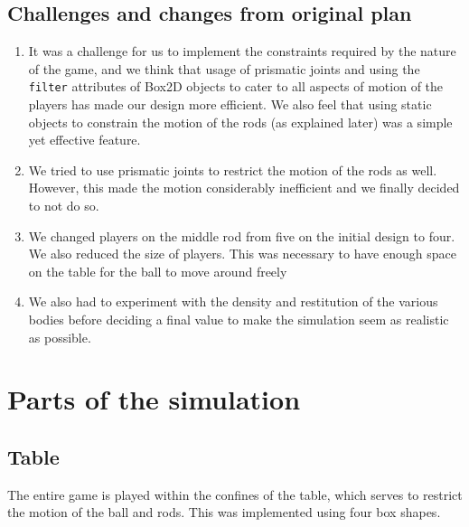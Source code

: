 \documentclass{article}
\begin{document}
\subsection{Challenges and changes from original plan}
\begin{enumerate}
\item It was a challenge for us to implement the constraints required by the nature of the game, and we think that usage of prismatic joints and using the \texttt{filter} attributes of Box2D objects to cater to all aspects of motion of the players has made our design more efficient. We also feel that using static objects to constrain the motion of the rods (as explained later) was a simple yet effective feature.\\
\item We tried to use prismatic joints to restrict the motion of the rods as well. However, this made the motion considerably inefficient and we finally decided to not do so.
\item We changed players on the middle rod from five on the initial design to four. We also reduced the size of players. This was necessary to have enough space on the table for the ball to move around freely
\item We also had to experiment with the density and restitution of the various bodies before deciding a final value to make the simulation seem as realistic as possible.
\end{enumerate}

\section{Parts of the simulation}

\subsection{Table}
The entire game is played within the confines of the table, which serves to restrict the motion of the ball and rods. This was implemented using four box shapes.\\
\end{document}
